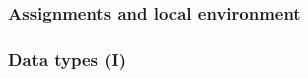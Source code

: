 \documentclass[ucs]{beamer}
\begin{document}
   \begin{frame}
    \frametitle{Assignments and local environment}

  \end{frame}
  
  \begin{frame}
    \frametitle{Data types (I)}

  \end{frame}
  
  \begin{frame}
  \end{frame}
  
  \begin{frame}
    \begin{center}
    \end{center}
  \end{frame}
  
  \begin{frame}
  \end{frame}
  
  
  \begin{frame}
  \end{frame}
  
  \begin{frame}
  \end{frame}
  
  
  
  
\end{document}
